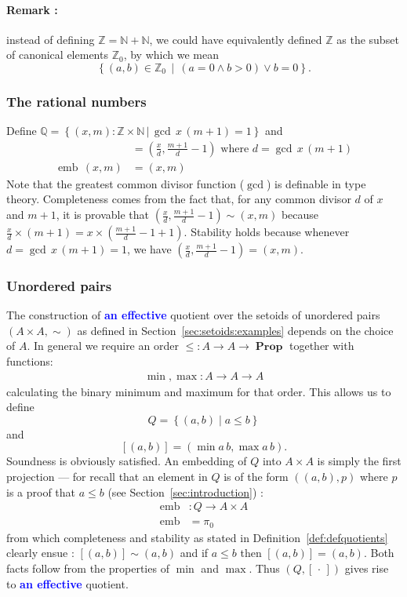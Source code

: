 \documentclass[envcountsame]{llncs}
\newcommand{\amend}[2][]{\textcolor{blue}{#2}}
\newcommand{\adefinable}{\amend[]{\textbf{an effective }}}
\newcommand{\N}{\mathbb{N}}
\newcommand{\Q}{\mathbb{Q}}
\newcommand{\Z}{\mathbb{Z}}
\newcommand{\dotph}{\,\cdot\,} %
\providecommand{\class}[1]{[#1]}
\providecommand{\set}  [1]{\left\{#1\right\}}
\DeclareMathOperator{\Prop}{\mathbf{Prop}}
\DeclareMathOperator{\emb}{emb}
\renewcommand{\equiv}{=}
\begin{document}
\paragraph{Remark : } instead of defining $\Z = \N+\N$, we could have equivalently defined $\Z$ as the subset of canonical elements $\Z_0$, by which we mean  \[
 \set{(a,b)\in\Z_0\,\mid\,(a\equiv 0\land b>0)\lor b\equiv 0}.
 \]   

\subsubsection*{The rational numbers}

Define $\Q = \set{(x,m):\Z\times\N \,|\, \gcd\, x\,  (m+1) = 1}$ and
\begin{align*}
\class{(x,m)}&=\left(\frac{x}{d},\frac{m+1}{d}-1\right) \text{ where } d = \gcd\,x \,(m+1)\\
\emb \,(x,m) &= (x,m)
\end{align*}
Note that the greatest common divisor function ($\gcd$) is definable in type theory. Completeness comes from the fact that, for any common divisor $d$ of $x$ and $m+1$, it is provable that $\left(\frac x d,\frac {m+1} d-1\right)\sim\left(x,m\right)$ because $\frac x d \times (m+1) = x\times(\frac {m+1} d - 1+1)$.  Stability holds because whenever $d=\gcd\, x\, (m+1) = 1$, we have $\left(\frac{x}{d},\frac{m+1}{d}-1\right)=(x,m)$.


\subsubsection*{Unordered pairs}

The construction of \adefinable quotient over the setoids of unordered pairs $(A\times A,\sim)$ as defined in Section~\ref{sec:setoids:examples} depends on the choice of $A$. In general we
require an order $\leq : A \to A \to \Prop$ together with functions:
\begin{align*}
\min, \max : A \to A \to A
\end{align*}
calculating the binary minimum and maximum for that order. This allows us to  define
\[
Q = \set{(a , b) \mid  a \leq b}
\]
and
\[
[(a,b)] = (\min a\, b, \max a \,b).
\]
Soundness is obviously satisfied. An embedding of $Q$ into  $A\times A$ is simply the first projection --- for recall that an element in $Q$ is of the form $((a,b),p)$ where $p$ is a proof that $a\leq b$ (see Section~\ref{sec:introduction}) :
\begin{align*}
\emb &: Q \to A\times A\\
\emb &= \pi_0
\end{align*}
from which completeness and stability as stated in Definition~\ref{def:defquotients} clearly ensue : $[(a,b)] \sim (a,b)$ and if $a\leq b$ then $[(a,b)]=(a,b)$. Both facts follow from
 the properties of $\min$ and $\max$.
Thus $(Q,\class\dotph)$ gives rise to \adefinable quotient.
\end{document}
